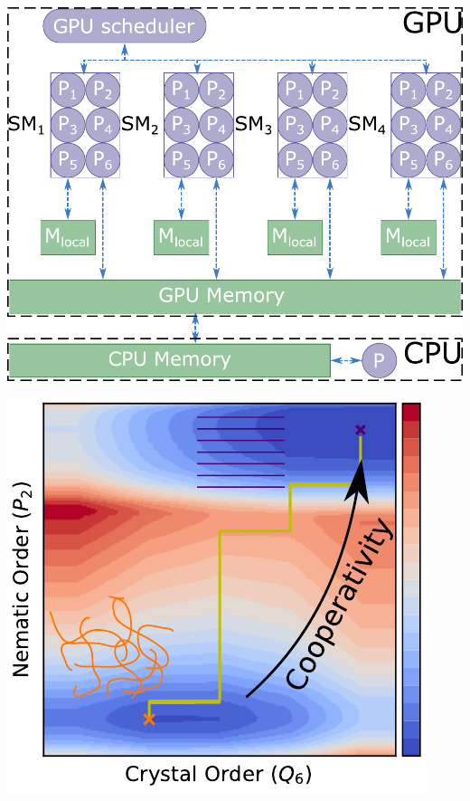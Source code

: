 \documentclass[aspectratio=169]{beamer}
\begin{document}
\begin{frame}[c]{}

  \centering
  \includegraphics[height=\textheight]{../figures/ch3_gpu/fig-GPU_arch/fig-GPU_arch.pdf}

\end{frame}

\begin{frame}[c]{}

  \centering
  \includegraphics[height=\textheight]{../figures/fig-pathway_ToC_chains/fig-pathway_wArrow.pdf}

\end{frame}
\end{document}
